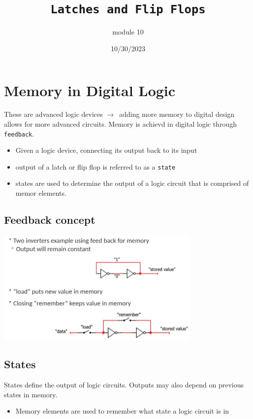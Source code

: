\documentclass[a4paper,12pt]{article}
\title{\texttt{Latches and Flip Flops}\\\hrulefill}
\author{module 10}
\date{\small{10/30/2023}}
\newcommand{\ra}{$\rightarrow$}
\begin{document}
    \maketitle

    \section{Memory in Digital Logic}
    These are advanced logic devices \ra~adding more memory to digital design allows for more advanced circuits. Memory is achievd in digital logic through \texttt{feedback}.
    \begin{itemize}
        \item Given a logic device, connecting its output back to its input
        \item output of a latch or flip flop is referred to as a \texttt{state}
        \item states are used to determine the output of a logic circuit that is comprised of memor elements.    
    \end{itemize}
    
        \subsection{Feedback concept}
            \includegraphics[width=10cm]{FeedbackConcept.JPG}
        \subsection{States}
            States define the output of logic circuits. Outputs may also depend on previous states in memory.
            \begin{itemize}
                \item Memory elements are used to remember what state a logic circuit is in
            \end{itemize}
            
\end{document}
